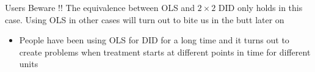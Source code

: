 \documentclass[aspectratio=169,t,11pt,table]{beamer}
\begin{document}
\begin{frame}{Users Beware !!}
  The equivalence between OLS and $2 \times 2$ DID only holds in this case. 
  Using OLS in other cases will turn out to bite us in the butt later on
  \begin{itemize}
    \item People have been using OLS for DID for a long time and it turns out to create problems when treatment starts at different points in time for different units
  \end{itemize}
\end{frame}







% 
%     
% 







\end{document}
